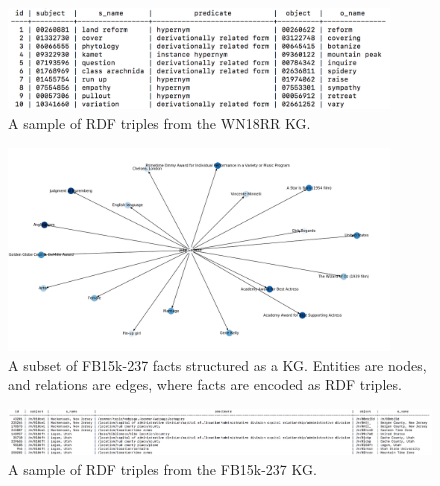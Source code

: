 \begin{figure}
   	\centering
    	\includegraphics[width=0.9\textwidth, height=0.3\textwidth]{wn18rr_fact_sample}
	\captionsetup{justification=centering}
	\caption{A sample of RDF triples from the WN18RR KG.}
\end{figure}

\begin{figure}[H]
   	\centering
    	\includegraphics[width=0.9\textwidth, height=0.6\textwidth]{FB15k-237_Graph}
	\captionsetup{justification=centering}
	\caption{A subset of FB15k-237 facts structured as a KG. Entities are nodes, and relations are edges, where facts are encoded as RDF triples.}
\end{figure}

\bigskip
\bigskip
\bigskip
\bigskip

\begin{figure}[H]
   	\centering
    	\includegraphics[width=1.0\textwidth, height=0.3\textwidth]{fb15k_237_fact_sample}
	\captionsetup{justification=centering}
	\caption{A sample of RDF triples from the FB15k-237 KG.}
\end{figure}

